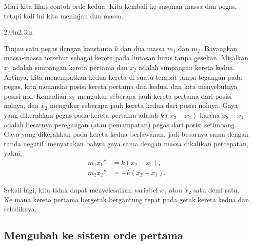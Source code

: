 \begin{example} \label{sintro:carts-example}
Mari kita lihat contoh orde kedua.
Kita kembali ke susunan massa dan pegas, tetapi kali ini kita
meninjau dua massa.

\begin{mywrapfigsimp}{2.0in}{2.3in}
\noindent
{}
\end{mywrapfigsimp}
Tinjau satu pegas dengan konstanta $k$ dan dua massa $m_1$
dan $m_2$.  Bayangkan massa-massa tersebut sebagai kereta pada
lintasan lurus tanpa gesekan.  Misalkan $x_1$ adalah simpangan kereta pertama
dan $x_2$ adalah simpangan kereta kedua.
Artinya, kita menempatkan kedua
kereta di suatu tempat tanpa tegangan pada pegas,
kita menandai posisi
kereta pertama dan kedua,
dan kita menyebutnya posisi nol.
Kemudian $x_1$ mengukur seberapa jauh kereta pertama dari posisi nolnya,
dan $x_2$ mengukur seberapa jauh kereta kedua dari posisi nolnya.
Gaya yang dikerahkan pegas pada kereta pertama adalah
$k(x_2-x_1)$
karena $x_2-x_1$ adalah besarnya peregangan (atau pemampatan) pegas dari
posisi setimbang.
Gaya yang dikerahkan pada kereta kedua berlawanan,
jadi besarnya sama dengan tanda negatif.
 menyatakan bahwa
gaya sama dengan massa dikalikan percepatan, yakni,
\begin{equation*}
\begin{aligned}
m_1 x_1'' & = k(x_2-x_1) , \\
m_2 x_2'' & = - k(x_2-x_1) .
\end{aligned}
\end{equation*}

Sekali lagi, kita tidak dapat menyelesaikan variabel $x_1$ atau $x_2$
satu demi satu.  Ke mana kereta pertama bergerak
bergantung tepat pada gerak kereta kedua dan sebaliknya.
\end{example}

\subsection{Mengubah ke sistem orde pertama}

